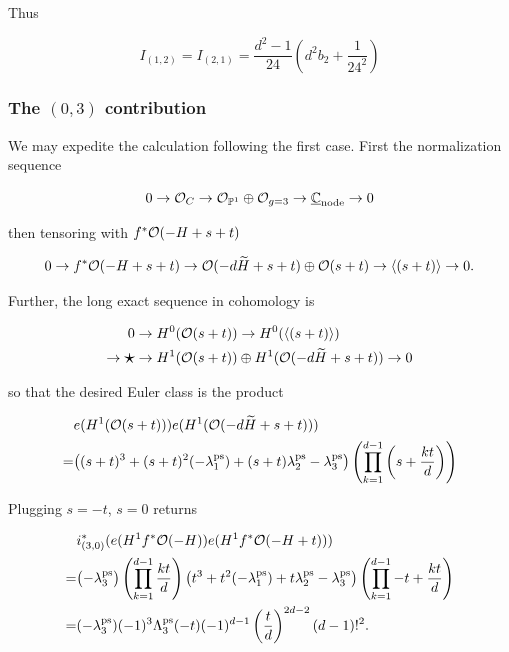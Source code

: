 \documentclass[12pt]{memoir}
\begin{document}
Thus


\[I_{(1,2)}=I_{(2,1)}=\frac{d^2-1}{24}\left(d^2b_2+\frac{1}{24^2}\right)\]


\subsubsection{The \((0,3)\) contribution}

We may expedite the calculation following the first case. First the normalization sequence


\[0\to\mathcal{O}_C\to \mathcal{O}_{\mathbb{P}^1}\oplus\mathcal{O}_{g=3}\to\underline{\mathbb{C}}_{\text{node}}\to 0\]


then tensoring with \(f^\ast\mathcal{O}(-H+s+t)\)


\[0\to f^\ast\mathcal{O}(-H+s+t)\to \mathcal{O}(-d\widetilde{H}+s+t)\oplus\mathcal{O}(s+t)\to\left\langle (s+t)\right\rangle\to 0.\]


Further, the long exact sequence in cohomology is

\begin{align*}
    0                                                          & \to H^0(\cO(s+t))\to H^0(\genr{(s+t)})                      \\
    \to {\raisebox{-0.08em}{\scalebox{1.5}{\ensuremath\star}}} & \to H^1(\cO(s+t))\oplus H^1(\cO(-d\widetilde{H}+s+t)) \to 0
\end{align*}

so that the desired Euler class is the product

\begin{align*}
      & e(H^1(\mathcal{O}(s+t)))e(H^1(\mathcal{O}(-d\widetilde{H}+s+t)))                                                                                \\
    = & \bigl((s+t)^3+(s+t)^2(-\lambda_1^{\operatorname{\mathrm{ps}}})+(s+t)\lambda_2^{\operatorname{\mathrm{ps}}}-\lambda_3^{\operatorname{\mathrm{ps}}}\bigr)\left(\prod_{k=1}^{d-1}\left(s+\frac{kt}{d}\right)\right)
\end{align*}

Plugging \(s=-t\), \(s=0\) returns

\begin{align*}
      & i_{(3,0)}^\ast(e(H^1f^\ast\mathcal{O}(-H))e(H^1f^\ast\mathcal{O}(-H+t)))                                                                                                                  \\
    = & \bigl(-\lambda_3^{\operatorname{\mathrm{ps}}}\bigr)\left(\prod_{k=1}^{d-1}\frac{kt}{d}\right)\bigl(t^3+t^2(-\lambda_1^{\operatorname{\mathrm{ps}}})+t\lambda_2^{\operatorname{\mathrm{ps}}}-\lambda_3^{\operatorname{\mathrm{ps}}}\bigr)\left(\prod_{k=1}^{d-1}-t+\frac{kt}{d}\right) \\
    = & (-\lambda_3^{\operatorname{\mathrm{ps}}})(-1)^3\Lambda_3^{\operatorname{\mathrm{ps}}}(-t)(-1)^{d-1}\left(\frac{t}{d}\right)^{2d-2}(d-1)!^2.
\end{align*}
\end{document}
